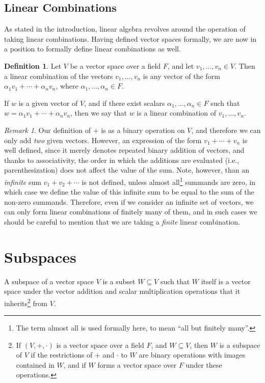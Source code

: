 \documentclass[svgnames]{article}
\theoremstyle{definition}
\newtheorem{Definition}[Theorem]{Definition}
\theoremstyle{remark}
\newtheorem*{Remark*}{Remark}
\newcommand{\newterm}[1]{{\color{alertcolor} #1}}
\begin{document}
\subsection{Linear Combinations}\label{subsec:LinComb}
As stated in the introduction, linear algebra revolves around the operation of taking linear combinations. Having defined vector spaces formally, we are now in a position to formally define linear combinations as well.
\begin{Definition}
Let $V$ be a vector space over a field $F$, and let $v_1, \ldots, v_n \in V$. Then a \newterm{linear combination} of the vectors $v_1, \ldots, v_n$ is any vector of the form $\alpha_1 v_1 + \cdots + \alpha_n v_n$, where $\alpha_1, \ldots, \alpha_n \in F$.

If $w$ is a given vector of $V$, and if there exist scalars $\alpha_1, \ldots, \alpha_n \in F$ such that $w = \alpha_1 v_1 + \cdots + \alpha_n v_n$, then we say that $w$ is a linear combination of $v_1, \ldots, v_n$.
\end{Definition}

\begin{Remark*}
Our definition of $+$ is as a binary operation on $V$, and therefore we can only add \emph{two} given vectors. However, an expression of the form $v_1 + \cdots + v_n$ is well defined, since it merely denotes repeated binary addition of vectors, and thanks to associativity, the order in which the additions are evaluated (i.e., parenthesization) does not affect the value of the sum. Note, however, than an \emph{infinite} sum $v_1 + v_2 + \cdots$ is not defined, unless almost all\footnote{
	The term \newterm{almost all} is used formally here, to mean ``all but finitely many''.
} summands are zero, in which case we define the value of this infinite sum to be equal to the sum of the non-zero summands. Therefore, even if we consider an infinite set of vectors, we can only form linear combinations of finitely many of them, and in such cases we should be careful to mention that we are taking a \emph{finite} linear combination.
\end{Remark*}

\section{Subspaces}\label{sec:Subspaces}
A \newterm{subspace} of a vector space $V$ is a subset $W \subseteq V$ such that $W$ itself is a vector space under the vector addition and scalar multiplication operations that it inherits\footnote{
	If $(V, +, \cdot)$ is a vector space over a field $F$, and $W \subseteq V$, then $W$ is a subspace of $V$ if the restrictions of $+$ and $\cdot$ to $W$ are binary operations with images contained in $W$, and if $W$ forms a vector space over $F$ under these operations.
} from $V$.
\end{document}

